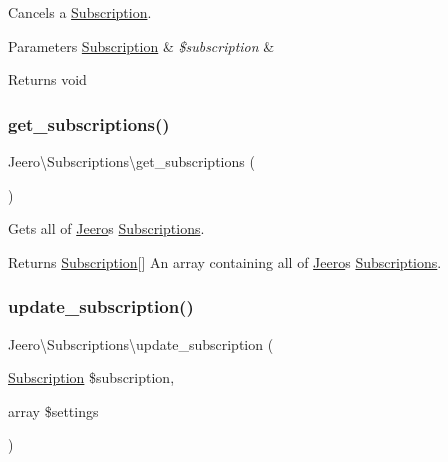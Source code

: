 Cancels a \hyperlink{classJeero_1_1Subscriptions_1_1Subscription}{Subscription}.


\begin{DoxyParams}[1]{Parameters}
\hyperlink{classJeero_1_1Subscriptions_1_1Subscription}{Subscription} & {\em \$subscription} & \\
\hline
\end{DoxyParams}
\begin{DoxyReturn}{Returns}
void 
\end{DoxyReturn}
\mbox{\label{namespaceJeero_1_1Subscriptions_af143e8607705a82067cfe4082cf5f3a5}} 
\subsubsection{\texorpdfstring{get\+\_\+subscriptions()}{get\_subscriptions()}}
{\footnotesize\ttfamily Jeero\textbackslash{}\+Subscriptions\textbackslash{}get\+\_\+subscriptions (\begin{DoxyParamCaption}{ }\end{DoxyParamCaption})}

Gets all of \hyperlink{namespaceJeero}{Jeero}\textquotesingle{}s \hyperlink{namespaceJeero_1_1Subscriptions}{Subscriptions}.

\begin{DoxyReturn}{Returns}
\hyperlink{classJeero_1_1Subscriptions_1_1Subscription}{Subscription}\mbox{[}\mbox{]} An array containing all of \hyperlink{namespaceJeero}{Jeero}\textquotesingle{}s \hyperlink{namespaceJeero_1_1Subscriptions}{Subscriptions}. 
\end{DoxyReturn}
\mbox{\label{namespaceJeero_1_1Subscriptions_a02cb69ca8b573c4397759a6ddde6af28}} 
\subsubsection{\texorpdfstring{update\+\_\+subscription()}{update\_subscription()}}
{\footnotesize\ttfamily Jeero\textbackslash{}\+Subscriptions\textbackslash{}update\+\_\+subscription (\begin{DoxyParamCaption}\item[{\hyperlink{classJeero_1_1Subscriptions_1_1Subscription}{Subscription}}]{\$subscription,  }\item[{array}]{\$settings }\end{DoxyParamCaption})}

